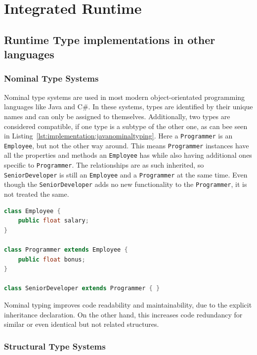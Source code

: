 \section{Integrated Runtime}
\label{sec:integrated-runtime}

\subsection{Runtime Type implementations in other languages}
\label{sec:runtime-other-languages}

\subsubsection{Nominal Type Systems}

Nominal type systems are used in most modern object-orientated programming languages like Java and C\#. In these systems, types are identified by their unique names and can only be assigned to themselves. Additionally, two types are considered compatible, if one type is a subtype of the other one, as can bee seen in Listing~\ref{lst:implementation:javanominaltyping}. Here a  \lstinline|Programmer| is an \lstinline|Employee|, but not the other way around. This means \lstinline|Programmer| instances have all the properties and methods an \lstinline|Employee| has while also having additional ones specific to \lstinline|Programmer|. The relationships are as such inherited, so \lstinline|SeniorDeveloper| is still an \lstinline|Employee| and a \lstinline|Programmer| at the same time. Even though the \lstinline|SeniorDeveloper| adds no new functionality to the \lstinline|Programmer|, it is not treated the same.

\begin{lstlisting}[language=Java,caption=Example of nominal typing in Java,label=lst:implementation:javanominaltyping]
class Employee {
	public float salary;
}

class Programmer extends Employee {
	public float bonus;
}

class SeniorDeveloper extends Programmer { }
\end{lstlisting}

Nominal typing improves code readability and maintainability, due to the explicit inheritance declaration. On the other hand, this increases code redundancy for similar or even identical but not related structures.

\subsubsection{Structural Type Systems}

